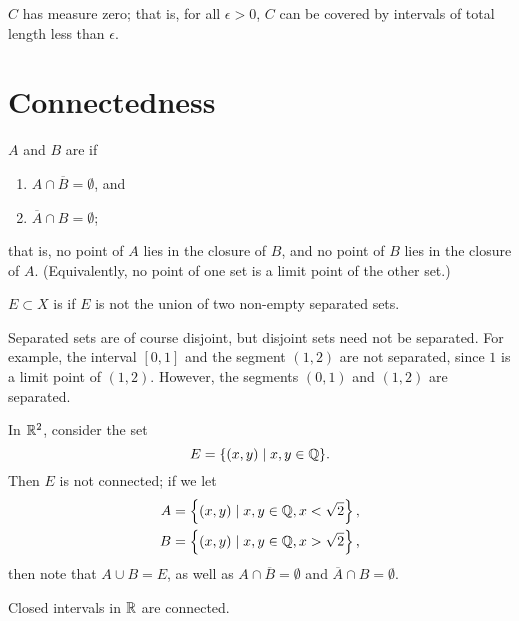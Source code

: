 \begin{proposition}
$C$ has measure zero; that is, for all $\epsilon>0$, $C$ can be covered by intervals of total length less than $\epsilon$.
\end{proposition}
\pagebreak

\section{Connectedness}
\begin{definition}[Connectedness]
$A$ and $B$ are  if
\begin{enumerate}[label=(\roman*)]
\item $A\cap\overline{B}=\emptyset$, and
\item $\overline{A}\cap B=\emptyset$;
\end{enumerate}
that is, no point of $A$ lies in the closure of $B$, and no point of $B$ lies in the closure of $A$. (Equivalently, no point of one set is a limit point of the other set.)

$E\subset X$ is  if $E$ is not the union of two non-empty separated sets. 
\end{definition}

\begin{remark}
Separated sets are of course disjoint, but disjoint sets need not be separated. For example, the interval $[0,1]$ and the segment $(1,2)$ are not separated, since $1$ is a limit point of $(1,2)$. However, the segments $(0,1)$ and $(1,2)$ are separated.
\end{remark}

\begin{example}
In $\mathbb R^2$, consider the set
\[E=\{(x,y)\mid x,y\in\mathbb Q\}.\]
Then $E$ is not connected; if we let
\begin{align*}
A&=\left\{(x,y)\mid x,y\in\mathbb Q,x<\sqrt{2}\right\},\\
B&=\left\{(x,y)\mid x,y\in\mathbb Q,x>\sqrt{2}\right\},
\end{align*}
then note that $A\cup B=E$, as well as $A\cap\overline{B}=\emptyset$ and $\overline{A}\cap B=\emptyset$.
\end{example}

\begin{proposition}\label{prop:connected-closed-interval}
Closed intervals in $\mathbb R$ are connected.
\end{proposition}


